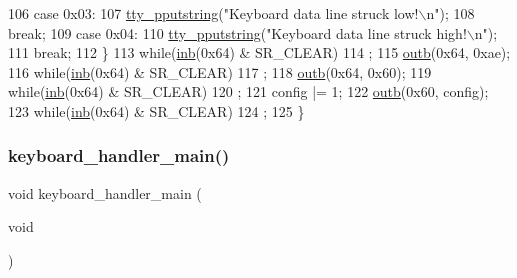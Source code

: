 \begin{DoxyCode}
106         \textcolor{keywordflow}{case} 0x03:
107             \hyperlink{a00179_ade960b1320324706aac6c00cc6b1b2fe_ade960b1320324706aac6c00cc6b1b2fe}{tty\_pputstring}(\textcolor{stringliteral}{"Keyboard data line struck low!\(\backslash\)n"});
108             \textcolor{keywordflow}{break};
109         \textcolor{keywordflow}{case} 0x04:
110             \hyperlink{a00179_ade960b1320324706aac6c00cc6b1b2fe_ade960b1320324706aac6c00cc6b1b2fe}{tty\_pputstring}(\textcolor{stringliteral}{"Keyboard data line struck high!\(\backslash\)n"});
111             \textcolor{keywordflow}{break};
112     \}
113     \textcolor{keywordflow}{while}(\hyperlink{a00164_a0223c8898dfec29069879dc51076e28a_a0223c8898dfec29069879dc51076e28a}{inb}(0x64) & SR\_CLEAR)
114         ;
115     \hyperlink{a00164_aa37f5841c54156a4b14fc0d6f626b44f_aa37f5841c54156a4b14fc0d6f626b44f}{outb}(0x64, 0xae);
116     \textcolor{keywordflow}{while}(\hyperlink{a00164_a0223c8898dfec29069879dc51076e28a_a0223c8898dfec29069879dc51076e28a}{inb}(0x64) & SR\_CLEAR)
117         ;
118     \hyperlink{a00164_aa37f5841c54156a4b14fc0d6f626b44f_aa37f5841c54156a4b14fc0d6f626b44f}{outb}(0x64, 0x60);
119     \textcolor{keywordflow}{while}(\hyperlink{a00164_a0223c8898dfec29069879dc51076e28a_a0223c8898dfec29069879dc51076e28a}{inb}(0x64) & SR\_CLEAR)
120         ;
121     config |= 1;
122     \hyperlink{a00164_aa37f5841c54156a4b14fc0d6f626b44f_aa37f5841c54156a4b14fc0d6f626b44f}{outb}(0x60, config);
123     \textcolor{keywordflow}{while}(\hyperlink{a00164_a0223c8898dfec29069879dc51076e28a_a0223c8898dfec29069879dc51076e28a}{inb}(0x64) & SR\_CLEAR)
124         ;
125 \}
\end{DoxyCode}
\mbox{\label{a00038_a1db933be72a0547c4070ba55e6697ba2_a1db933be72a0547c4070ba55e6697ba2}} 
\subsubsection{\texorpdfstring{keyboard\+\_\+handler\+\_\+main()}{keyboard\_handler\_main()}}
{\footnotesize\ttfamily void keyboard\+\_\+handler\+\_\+main (\begin{DoxyParamCaption}\item[{void}]{ }\end{DoxyParamCaption})}



